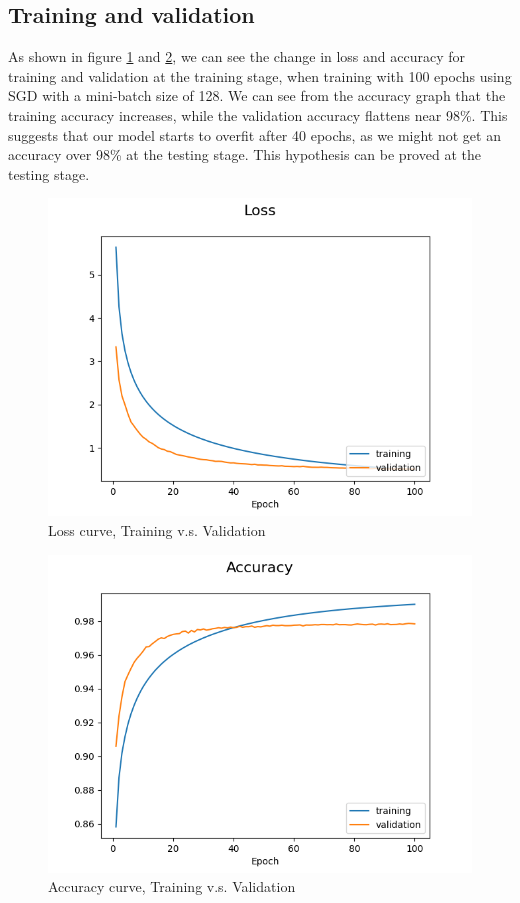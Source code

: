 \documentclass{article}
\begin{document}
    \subsection{Training and validation}
            As shown in figure \ref{fig:2} and \ref{fig:3}, we can see the change
            in loss and accuracy for training and validation at the training
            stage, when training with 100 epochs using SGD with a mini-batch size
            of 128. We can see from the accuracy graph that the training accuracy
            increases, while the validation accuracy flattens near 98\%. 
            This suggests that our model starts to overfit after 40 epochs, as 
            we might not get an accuracy over 98\% at the testing stage. This 
            hypothesis can be proved at the testing stage.
    \begin{figure}[h]
        \includegraphics[scale=0.7]{Loss.png}
        \caption{Loss curve, Training v.s. Validation} \label{fig:2}
    \end{figure}
    \begin{figure}[h]
        \includegraphics[scale=0.7]{Accuracy.png}
        \caption{Accuracy curve, Training v.s. Validation} \label{fig:3}
    \end{figure}
\end{document}
